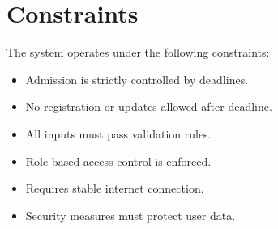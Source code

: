 \section{Constraints}

The system operates under the following constraints:
\begin{itemize}
    \item Admission is strictly controlled by deadlines.
    \item No registration or updates allowed after deadline.
    \item All inputs must pass validation rules.
    \item Role-based access control is enforced.
    \item Requires stable internet connection.
    \item Security measures must protect user data.
\end{itemize}